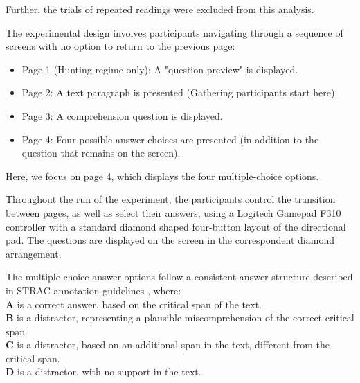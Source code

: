 \documentclass{article}
\begin{document}
    Further, the trials of repeated readings were excluded from this analysis.
    \newline
    
    The experimental design involves participants navigating through a sequence of screens with no option to return to the previous page:
    \begin{itemize}
        \item Page 1 (Hunting regime only): A "question preview" is displayed.
        \item Page 2: A text paragraph is presented (Gathering participants start here).
        \item Page 3: A comprehension question is displayed.
        \item Page 4: Four possible answer choices are presented (in addition to the question that remains on the screen).
    \end{itemize}

    Here, we focus on page 4, which displays the four multiple-choice options.
    
    Throughout the run of the experiment, the participants control the transition between pages, as well as select their answers, using a Logitech Gamepad F310 controller with a standard diamond shaped four-button layout of the directional pad. The questions are displayed on the screen in the correspondent diamond arrangement.  

    The multiple choice answer options follow a consistent answer structure described in STRAC annotation guidelines \parencite{berzak2020starc}, where:\\
    \textbf{A} is a correct answer, based on the critical span of the text.\\
    \textbf{B} is a distractor, representing a plausible miscomprehension of the correct critical span. \\
    \textbf{C} is a distractor, based on an additional span in the text, different from the critical span. \\
    \textbf{D} is a distractor, with no support in the text.
    
    
\end{document}
